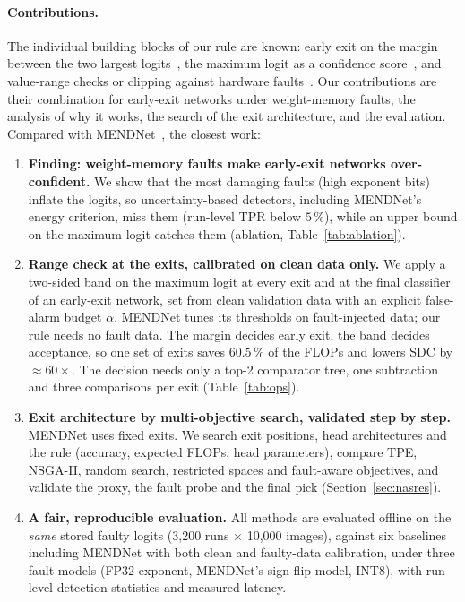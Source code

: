 \documentclass[10pt,a4paper]{article}
\begin{document}
\paragraph{Contributions.} The individual building blocks of our rule are known: early exit on the margin
between the two largest logits~\cite{bigLittle}, the maximum logit as a confidence score~\cite{maxlogit}, and
value-range checks or clipping against hardware faults~\cite{li2017,ranger,ftclipact}. Our contributions are their
combination for early-exit networks under weight-memory faults, the analysis of why it works, the search of the
exit architecture, and the evaluation. Compared with MENDNet~\cite{mendnet}, the closest work:
\begin{enumerate}
  \item \textbf{Finding: weight-memory faults make early-exit networks over-confident.} We show that the most
        damaging faults (high exponent bits) inflate the logits, so uncertainty-based detectors, including
        MENDNet's energy criterion, miss them (run-level TPR below $5\,\%$), while an upper bound on the maximum
        logit catches them (ablation, Table~\ref{tab:ablation}).
  \item \textbf{Range check at the exits, calibrated on clean data only.} We apply a two-sided band on the maximum
        logit at every exit and at the final classifier of an early-exit network, set from clean validation data
        with an explicit false-alarm budget $\alpha$. MENDNet tunes its thresholds on fault-injected data; our rule
        needs no fault data. The margin decides early exit, the band decides acceptance, so one set of exits saves
        $60.5\,\%$ of the FLOPs and lowers SDC by $\approx 60\times$. The decision needs only a top-2 comparator
        tree, one subtraction and three comparisons per exit (Table~\ref{tab:ops}).
  \item \textbf{Exit architecture by multi-objective search, validated step by step.} MENDNet uses fixed exits.
        We search exit positions, head architectures and the rule (accuracy, expected FLOPs, head parameters),
        compare TPE, NSGA-II, random search, restricted spaces and fault-aware objectives, and validate the proxy,
        the fault probe and the final pick (Section~\ref{sec:nasres}).
  \item \textbf{A fair, reproducible evaluation.} All methods are evaluated offline on the \emph{same} stored
        faulty logits (3{,}200 runs $\times$ 10{,}000 images), against six baselines including MENDNet with both
        clean and faulty-data calibration, under three fault models (FP32 exponent, MENDNet's sign-flip model,
        INT8), with run-level detection statistics and measured latency.
\end{enumerate}
\end{document}
